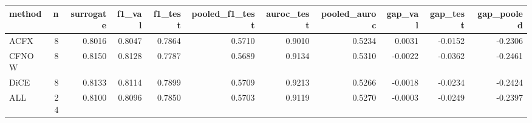 \begin{tabular}{lrrrrrrrrrr}
\toprule
method &  n &  surrogate &  f1\_val &  f1\_test &  pooled\_f1\_test &  auroc\_test &  pooled\_auroc &  gap\_val &  gap\_test &  gap\_pooled \\
\midrule
  ACFX &  8 &     0.8016 &  0.8047 &   0.7864 &          0.5710 &      0.9010 &        0.5234 &   0.0031 &   -0.0152 &     -0.2306 \\
 CFNOW &  8 &     0.8150 &  0.8128 &   0.7787 &          0.5689 &      0.9134 &        0.5310 &  -0.0022 &   -0.0362 &     -0.2461 \\
  DiCE &  8 &     0.8133 &  0.8114 &   0.7899 &          0.5709 &      0.9213 &        0.5266 &  -0.0018 &   -0.0234 &     -0.2424 \\
   ALL & 24 &     0.8100 &  0.8096 &   0.7850 &          0.5703 &      0.9119 &        0.5270 &  -0.0003 &   -0.0249 &     -0.2397 \\
\bottomrule
\end{tabular}
